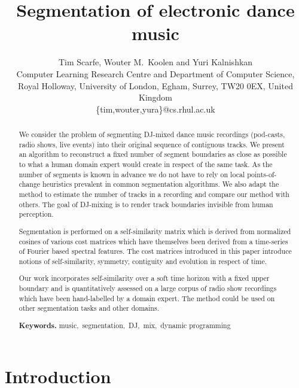 \documentclass[twocolumn]{article}
\author{Tim Scarfe, Wouter M.~Koolen and Yuri Kalnishkan \\ 
	Computer Learning Research
	Centre and Department of Computer Science, \\ 
	Royal Holloway,  University of London, Egham, Surrey, TW20 0EX, United Kingdom\\
	\{tim,wouter,yura\}@cs.rhul.ac.uk
}
\title{Segmentation of electronic dance music}
\begin{document}
	
	\maketitle
	
	\begin{abstract}
		
		We consider the problem of segmenting DJ-mixed dance music recordings (pod-casts, radio shows, live events) into their original sequence of contiguous tracks. We present an algorithm to reconstruct a fixed number of segment boundaries as close as possible to what a human domain expert would create in respect of the same task. As the number of segments is known in advance we do not have to rely on local points-of-change heuristics prevalent in common segmentation algorithms. We also adapt the method to estimate the number of tracks in a recording and compare our method with others. The goal of DJ-mixing is to render track boundaries invisible from human perception.
		
		Segmentation is performed on a self-similarity matrix which is derived from normalized cosines of various cost matrices which have themselves been derived from a time-series of Fourier based spectral features. The cost matrices introduced in this paper introduce notions of self-similarity, symmetry, contiguity and evolution in respect of time. 
		
		Our work incorporates self-similarity over a soft time horizon with a fixed upper boundary and is quantitatively assessed on a large corpus of radio show recordings which have been hand-labelled by a domain expert. The method could be used on other segmentation tasks and other domains. 
		\smallskip
		
		\noindent \textbf{Keywords.} \noindent music,~segmentation,~DJ,~mix,~dynamic programming
		
	\end{abstract}
	
	
	\vspace{1em}
	
	\section{Introduction}
	
\end{document}
